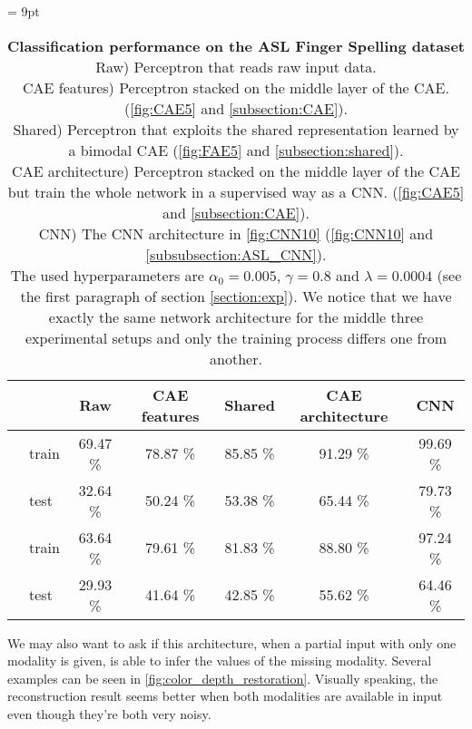 \begin{table}[H]
  \tabcolsep = 9pt
  \caption{\textbf{Classification performance on the ASL Finger Spelling
    dataset}\\[0.1em]
    Raw) Perceptron that reads raw input data.\\[0.1em]
    CAE features) Perceptron stacked on the middle layer of the CAE.
      (\autoref{fig:CAE5} and \ref{subsection:CAE}).\\[0.1em]
    Shared) Perceptron that exploits the shared representation learned
      by a bimodal CAE (\autoref{fig:FAE5} and
      \ref{subsection:shared}).\\[0.1em]
    CAE architecture) Perceptron stacked on the middle layer of the CAE
      but train the whole network in a supervised way as a CNN.
      (\autoref{fig:CAE5} and \ref{subsection:CAE}).\\[0.1em]
    CNN) The CNN architecture in \autoref{fig:CNN10}
      (\autoref{fig:CNN10} and \ref{subsubsection:ASL_CNN}). \\[0.1em]
    The used hyperparameters are $\alpha_0=0.005$, $\gamma=0.8$ and
    $\lambda=0.0004$ (see the first paragraph of section \ref{section:exp}).
    We notice that we have exactly the same network
    architecture for the middle three experimental setups and only the
    training process differs one from another.
    }
  \label{tab:ASL_classif}
  \begin{tabular*}{\linewidth}{>{\bf}llccccc}
    \toprule
    && Raw & CAE features & Shared & CAE architecture & CNN\\
    \midrule
    \multirow{2}{*}{Intensity} &
    train & 69.47 \% & 78.87 \% & 85.85 \% & 91.29 \% & 99.69 \% \\
    & test & 32.64 \% & 50.24 \% & 53.38 \% & 65.44 \% & 79.73 \% \\
    \midrule
    \multirow{2}{*}{Depth} &
    train & 63.64 \% & 79.61 \% & 81.83 \% & 88.80 \% & 97.24 \% \\
    & test & 29.93 \% & 41.64 \% & 42.85 \% & 55.62 \% & 64.46 \% \\
    \bottomrule
  \end{tabular*}
\end{table}
\vspace{-10pt}

We may also want to ask if this architecture, when a partial input with
only one modality is given, is able to infer the values of the missing
modality.
Several examples can be seen in \autoref{fig:color_depth_restoration}.
Visually speaking, the reconstruction result seems better when
both modalities are available in input even though they're both very noisy.

